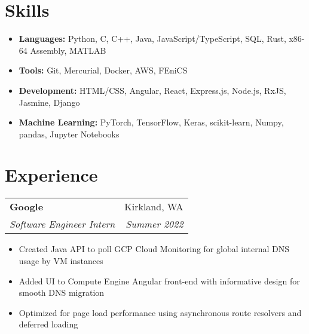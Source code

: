 \documentclass[letterpaper,11pt]{article}
\makeatletter
\newcommand{\resitem}[1]{\item[--] #1}
\newcommand{\ressubheading}[4]{
	\vspace{3pt}
	\begin{tabular*}{7.5in}{l@{\extracolsep{\fill}}r}
			\textbf{#1} & #2 \\
			\textit{#3} & \textit{#4}
	\end{tabular*}
}
\makeatother
\begin{document}


\section{Skills}

\begin{itemize}
	\resitem{
		\textbf{Languages:}
		Python,
		C,
		C++,
		Java,
		JavaScript/TypeScript,
		SQL,
		Rust,
		x86-64 Assembly,
		MATLAB
	}
	\resitem{
		\textbf{Tools:}
		Git,
		Mercurial,
		Docker,
		AWS,
		FEniCS
	}
	\resitem{
		\textbf{Development:}
		HTML/CSS,
		Angular,
		React,
		Express.js,
		Node.js,
		RxJS,
		Jasmine,
		Django
	}
	\resitem{
		\textbf{Machine Learning:}
		PyTorch,
		TensorFlow,
		Keras,
		scikit-learn,
		Numpy,
		pandas,
		Jupyter Notebooks
	}
\end{itemize}

\section{Experience}

\ressubheading{Google}
{Kirkland, WA}
{Software Engineer Intern}
{Summer 2022}
\begin{itemize}
	\resitem{
		Created Java API to poll GCP Cloud Monitoring for global internal DNS
		usage by VM instances
	}
	\resitem{
		Added UI to Compute Engine Angular front-end with informative design for
		smooth DNS migration
	}
	\resitem{
		Optimized for page load performance using asynchronous route resolvers
		and deferred loading
	}
\end{itemize}
\end{document}
